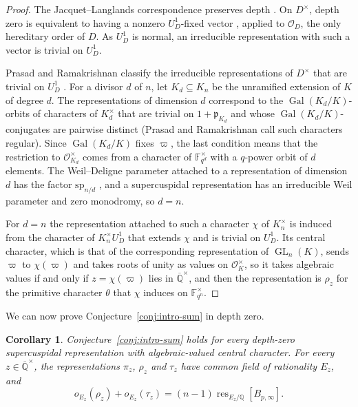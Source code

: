 \documentclass[a4paper,11pt]{amsart}
\newtheorem{corollary}[theorem]{Corollary}
\theoremstyle{definition}
\theoremstyle{remark}
\numberwithin{equation}{section}
\newcommand{\Q}{\mathbb{Q}}
\DeclareMathOperator{\res}{res}
\DeclareMathOperator{\Gal}{Gal}
\DeclareMathOperator{\GL}{GL}
\newcommand{\F}{\mathbb{F}}
\newcommand{\Qbar}{\overline{\mathbb{Q}}}
\newcommand{\OO}{\mathcal{O}}
\begin{document}
\begin{proof}
The Jacquet--Langlands correspondence preserves depth \cite[Corollary~2.8]{ABPS16}. On $D^\times$, depth zero is equivalent to having a nonzero $U_D^1$-fixed vector \cite[\S2.4 and Proposition~2.5]{ABPS16}, applied to $\OO_D$, the only hereditary order of $D$. As $U_D^1$ is normal, an irreducible representation with such a vector is trivial on $U_D^1$.

Prasad and Ramakrishnan classify the irreducible representations of $D^\times$ that are trivial on $U_D^1$ \cite[\S4, pp.~758--759]{PR12}. For a divisor $d$ of $n$, let $K_d\subseteq K_n$ be the unramified extension of $K$ of degree $d$. The representations of dimension $d$ correspond to the $\Gal(K_d/K)$-orbits of characters of $K_d^\times$ that are trivial on $1+\mathfrak p_{K_d}$ and whose $\Gal(K_d/K)$-conjugates are pairwise distinct (Prasad and Ramakrishnan call such characters regular). Since $\Gal(K_d/K)$ fixes $\varpi$, the last condition means that the restriction to $\OO_{K_d}^\times$ comes from a character of $\F_{q^d}^\times$ with a $q$-power orbit of $d$ elements. The Weil--Deligne parameter attached to a representation of dimension $d$ has the factor $\mathrm{sp}_{n/d}$ \cite[Theorem~4.4]{PR12}, and a supercuspidal representation has an irreducible Weil parameter and zero monodromy, so $d=n$.

For $d=n$ the representation attached to such a character $\chi$ of $K_n^\times$ is induced from the character of $K_n^\times U_D^1$ that extends $\chi$ and is trivial on $U_D^1$. Its central character, which is that of the corresponding representation of $\GL_n(K)$, sends $\varpi$ to $\chi(\varpi)$ and takes roots of unity as values on $\OO_K^\times$, so it takes algebraic values if and only if $z=\chi(\varpi)$ lies in $\Qbar^\times$, and then the representation is $\rho_z$ for the primitive character $\theta$ that $\chi$ induces on $\F_{q^n}^\times$.
\end{proof}

We can now prove Conjecture~\ref{conj:intro-sum} in depth zero.

\begin{corollary}\label{cor:depth-zero-relation}
Conjecture~\ref{conj:intro-sum} holds for every depth-zero supercuspidal representation with algebraic-valued central character. For every $z\in\Qbar^\times$, the representations $\pi_z$, $\rho_z$ and $\tau_z$ have common field of rationality $E_z$, and
\[
 o_{E_z}(\rho_z)+o_{E_z}(\tau_z)=(n-1)\res_{E_z/\Q}[B_{p,\infty}].
\]
\end{corollary}
\end{document}
